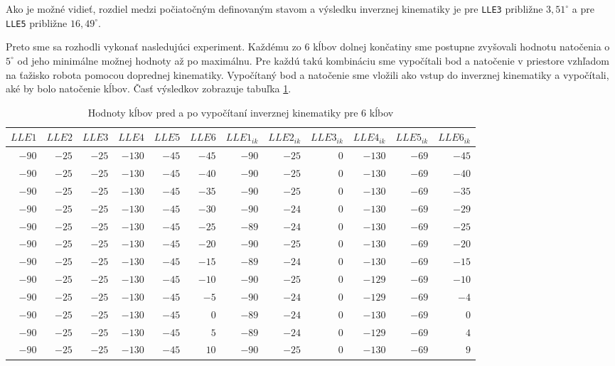 Ako je možné vidieť, rozdiel medzi počiatočným definovaným stavom a výsledku inverznej kinematiky je pre \texttt{LLE3} približne $3,51^{\circ}$ a pre \texttt{LLE5} približne $16,49^{\circ}$. 

Preto sme sa rozhodli vykonať nasledujúci experiment. Každému zo 6 kĺbov dolnej končatiny sme postupne zvyšovali hodnotu natočenia o $5^{\circ}$ od jeho minimálne možnej hodnoty až po maximálnu. Pre každú takú kombináciu sme vypočítali bod a natočenie v priestore vzhľadom na ťažisko robota pomocou doprednej kinematiky. Vypočítaný bod a natočenie sme vložili ako vstup do inverznej kinematiky a vypočítali, aké by bolo natočenie kĺbov. Časť výsledkov zobrazuje tabuľka \ref{tab_test_ik_6joint_5deg}.

\begin{table}[H]
	\centering
	\tiny
	\begin{tabular}{||r|r|r|r|r|r||r|r|r|r|r|r||}
		\hline
		\hline
		$LLE1$ & $LLE2$ & $LLE3$ & $LLE4$ & $LLE5$ & $LLE6$ & $LLE1_{ik}$ & $LLE2_{ik}$ & $LLE3_{ik}$ & $LLE4_{ik}$ & $LLE5_{ik}$ & $LLE6_{ik}$ \\
		\hline
		\hline
		$-90$ & $-25$ & $-25$ & $-130$ & $-45$ & $-45$ & $-90$ & $-25$ & $0$ & $-130$ & $-69$ & $-45$ \\
		\hline
		$-90$ & $-25$ & $-25$ & $-130$ & $-45$ & $-40$ & $-90$ & $-25$ & $0$ & $-130$ & $-69$ & $-40$ \\
		\hline
		$-90$ & $-25$ & $-25$ & $-130$ & $-45$ & $-35$ & $-90$ & $-25$ & $0$ & $-130$ & $-69$ & $-35$ \\
		\hline
		$-90$ & $-25$ & $-25$ & $-130$ & $-45$ & $-30$ & $-90$ & $-24$ & $0$ & $-130$ & $-69$ & $-29$ \\
		\hline
		$-90$ & $-25$ & $-25$ & $-130$ & $-45$ & $-25$ & $-89$ & $-24$ & $0$ & $-130$ & $-69$ & $-25$ \\
		\hline
		$-90$ & $-25$ & $-25$ & $-130$ & $-45$ & $-20$ & $-90$ & $-25$ & $0$ & $-130$ & $-69$ & $-20$ \\
		\hline
		$-90$ & $-25$ & $-25$ & $-130$ & $-45$ & $-15$ & $-89$ & $-24$ & $0$ & $-130$ & $-69$ & $-15$ \\
		\hline
		$-90$ & $-25$ & $-25$ & $-130$ & $-45$ & $-10$ & $-90$ & $-25$ & $0$ & $-129$ & $-69$ & $-10$ \\
		\hline
		$-90$ & $-25$ & $-25$ & $-130$ & $-45$ & $-5$ & $-90$ & $-24$ & $0$ & $-129$ & $-69$ & $-4$ \\
		\hline
		$-90$ & $-25$ & $-25$ & $-130$ & $-45$ & $0$ & $-89$ & $-24$ & $0$ & $-130$ & $-69$ & $0$ \\
		\hline
		$-90$ & $-25$ & $-25$ & $-130$ & $-45$ & $5$ & $-89$ & $-24$ & $0$ & $-129$ & $-69$ & $4$ \\
		\hline
		$-90$ & $-25$ & $-25$ & $-130$ & $-45$ & $10$ & $-90$ & $-25$ & $0$ & $-130$ & $-69$ & $9$ \\
		\hline
		\hline
	\end{tabular}
	\caption{{Hodnoty kĺbov pred a po vypočítaní inverznej kinematiky pre 6 kĺbov}}
	\label{tab_test_ik_6joint_5deg}
\end{table}

